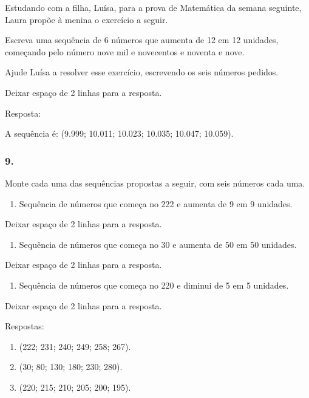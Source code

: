 \begin{enumerate}
\begin{escolha}
\begin{enumerate}
Estudando com a filha, Luísa, para a prova de Matemática da semana seguinte,
Laura propõe à menina o exercício a seguir.

Escreva uma sequência de 6 números que aumenta de 12 em 12 unidades,
começando pelo número nove mil e novecentos e noventa e nove.

Ajude Luísa a resolver esse exercício, escrevendo os seis números
pedidos.

Deixar espaço de 2 linhas para a resposta.

Resposta:

A sequência é: (9.999; 10.011; 10.023; 10.035; 10.047; 10.059).

\subsubsection{9.}\label{section-34}

Monte cada uma das sequências propostas a seguir, com seis números cada uma.

\begin{enumerate}
\def\labelenumi{\alph{enumi})}
\item
  Sequência de números que começa no 222 e aumenta de 9 em 9 unidades.
\end{enumerate}

Deixar espaço de 2 linhas para a resposta.

\begin{enumerate}
\def\labelenumi{\alph{enumi})}
\item
  Sequência de números que começa no 30 e aumenta de 50 em 50 unidades.
\end{enumerate}

Deixar espaço de 2 linhas para a resposta.

\begin{enumerate}
\def\labelenumi{\alph{enumi})}
\item
  Sequência de números que começa no 220 e diminui de 5 em 5 unidades.
\end{enumerate}

Deixar espaço de 2 linhas para a resposta.

Respostas:

\begin{enumerate}
\def\labelenumi{\alph{enumi})}
\item
  (222; 231; 240; 249; 258; 267).
\item
  (30; 80; 130; 180; 230; 280).
\item
  (220; 215; 210; 205; 200; 195).
\end{enumerate}


\end{enumerate}
\end{escolha}
\end{enumerate}
